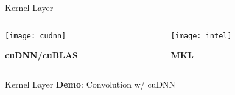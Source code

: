 
\begin{slide}{Kernel Layer}
  \begin{columns}
    \begin{column}{0.5\textwidth}
      \pause
      \centering
      \texttt{[image: cudnn]}

      \vspace{0.4cm}
      \textbf{cuDNN/cuBLAS}
    \end{column}
    \begin{column}{0.5\textwidth}
      \pause
      \centering
      \texttt{[image: intel]}

      \vspace{0.3cm}
      \textbf{MKL}
    \end{column}
  \end{columns}
\end{slide}

\begin{slide}{Kernel Layer}
  \huge
  \textbf{Demo}: Convolution w/ cuDNN
\end{slide}
